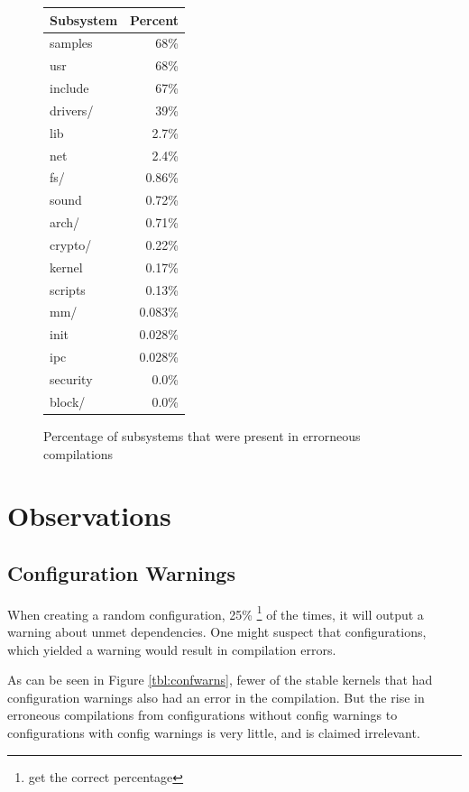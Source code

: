 \documentclass[a4paper,11pt]{report}
\newcommand{\figa}{
    \begin{figure}[!htpb]
    \centering
}
\newcommand{\figb}[2]{
    \caption{#1}
    \label{#2}
    \end{figure}
}
\begin{document}
\figa
    \begin{tabular}{l|r}
        \hline
        \hline
        \textbf{Subsystem} & \textbf{Percent} \\
        \hline
        
        samples & 68\%\\
        usr     & 68\%\\
        include & 67\%\\
        drivers/    &   39\% \\
        lib     & 2.7\%\\
        net     & 2.4\%\\
        fs/         & 0.86\% \\
        sound   & 0.72\%\\
        arch/   & 0.71\%\\
        crypto/ & 0.22\%\\
        kernel  & 0.17\%\\
        scripts & 0.13\%\\
        mm/ & 0.083\% \\
        init    & 0.028\%\\
        ipc     & 0.028\%\\
        security & 0.0\%\\
        block/  & 0.0\%\\

        \hline
        \hline
        
    \end{tabular}
\figb{Percentage of subsystems that were present in errorneous compilations}{}

\fi %




\iffalse %

\section{Observations}


    \subsection{Configuration Warnings}
When creating a random configuration, 25\%
    \footnote{get the correct percentage}
of the times, it will output a warning about unmet dependencies. One might
suspect that configurations, which yielded a warning would result in
compilation errors. 

As can be seen in Figure \ref{tbl:confwarns}, fewer of the stable kernels that 
had configuration warnings also had an error in the compilation. But the rise 
in erroneous compilations from configurations without config warnings to 
configurations with config warnings is very little, and is claimed irrelevant.
\end{document}
